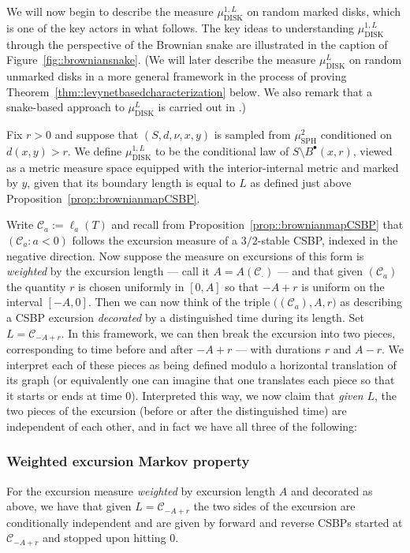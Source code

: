 \documentclass[JEP,XML,SOM,Unicode]{cedram}
\let\mathcal\mathscr
\newcommand{\sbullet}{{\scriptscriptstyle\bullet}}
\theoremstyle{plain}
\numberwithin{theorem}{section}
\theoremstyle{definition}
\newcommand{\CC}{{\mathcal C}}
\newcommand{\mustwo}{\mu_{\mathrm{SPH}}^2}
\newcommand{\mudonel}{\mu_{ \mathrm{DISK}}^{1, L}}
\newcommand{\mudl}{\mu_{\mathrm{DISK}}^L}
\newcommand{\fb}[2]{B^\sbullet(#1,#2)}
\begin{document}
We will now begin to describe the measure $\mudonel$ on random marked disks, which is one of the key actors in what follows. The key ideas to understanding $\mudonel$ through the perspective of the Brownian snake are illustrated in the caption of Figure~\ref{fig::browniansnake}. (We will later describe the measure $\mudl$ on random unmarked disks in a more general framework in the process of proving Theorem~\ref{thm::levynetbasedcharacterization} below. We also remark that a snake-based approach to $\mudl$ is carried out in \cite{alg}.)

Fix $r > 0$ and suppose that $(S,d,\nu,x,y)$ is sampled from $\mustwo$ conditioned on $d(x,y) >r$. We define $\mudonel$ to be the conditional law of $S \setminus \fb{x}{r}$, viewed as a metric measure space equipped with the interior-internal metric and marked by $y$, given that its boundary length is equal to $L$ as defined just above Proposition~\ref{prop::brownianmapCSBP}.

Write $\CC_a:=\ell_a(T)$ and recall from Proposition~\ref{prop::brownianmapCSBP} that $(\CC_a: a< 0)$ follows the excursion measure of a $3/2$-stable CSBP, indexed in the negative direction. Now suppose the measure on excursions of this form is \emph{weighted} by the excursion length --- call it $A=A(\CC_{\cdot})$ --- and that given $(\CC_a)$ the quantity $r$ is chosen uniformly in $[0,A]$ so that $-A + r$ is uniform on the interval $[-A,0]$. Then we can now think of the triple $\bigl((\CC_a), A, r\bigr)$ as describing a CSBP excursion \emph{decorated} by a distinguished time during its length. Set $L = \CC_{-A+r}$. In this framework, we can then break the excursion into two pieces, corresponding to time before and after $-A+r$ --- with durations $r$ and $A-r$. We interpret each of these pieces as being defined modulo a horizontal translation of its graph (or equivalently one can imagine that one translates each piece so that it starts or ends at time $0$). Interpreted this way, we now claim that \emph{given} $L$, the two pieces of the excursion (before or after the distinguished time) are independent of each other, and in fact we have all three of the following:

\subsubsection*{Weighted excursion Markov property} For the excursion measure \emph{weighted} by excursion length $A$ and decorated as above, we have that given $L =\CC_{-A+r}$ the two sides of the excursion are conditionally independent and are given by forward and reverse CSBPs started at $\CC_{-A+r}$ and stopped upon hitting $0$.
\end{document}
